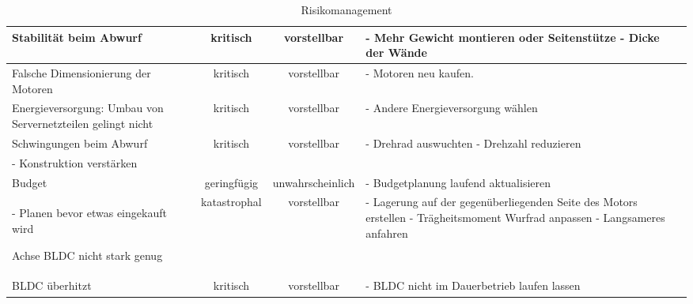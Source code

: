 \begin{landscape}
\begin{table}
\begin{tabular}{|p{5cm}|c|c|p{9cm}|}
			\hline \rowcolor{yellow} \hline Stabilität beim Abwurf & kritisch & vorstellbar &
			- Mehr Gewicht montieren oder Seitenstütze \newline
			- Dicke der Wände \\ 
			
			\hline \rowcolor{yellow} \hline Falsche Dimensionierung der Motoren & kritisch & vorstellbar &
			- Motoren neu kaufen. \\
			
			\hline \rowcolor{yellow} \hline Energieversorgung: Umbau von Servernetzteilen gelingt nicht & kritisch & vorstellbar &
			- Andere Energieversorgung wählen \\ 
			
			\hline \rowcolor{yellow} \hline Schwingungen beim Abwurf & kritisch & vorstellbar &
			- Drehrad auswuchten \newline
			- Drehzahl reduzieren \\
			- Konstruktion verstärken \\
			
			\hline \rowcolor{green} \hline Budget & geringfügig & unwahrscheinlich &
			- Budgetplanung laufend aktualisieren  \\ 
			- Planen bevor etwas eingekauft wird
			
			\hline \rowcolor{yellow} \hline Achse BLDC nicht stark genug & katastrophal & vorstellbar &
			- Lagerung auf der gegenüberliegenden Seite des Motors erstellen \newline
			- Trägheitsmoment Wurfrad anpassen \newline
			- Langsameres anfahren \\
			
			\hline \rowcolor{yellow} \hline BLDC überhitzt & kritisch & vorstellbar &
			- BLDC nicht im Dauerbetrieb laufen lassen \newline
			
			
			
		\end{tabular}
		\caption{Risikomanagement}
		\label{tab:risikomanagement}
	\end{table} 
\end{landscape}